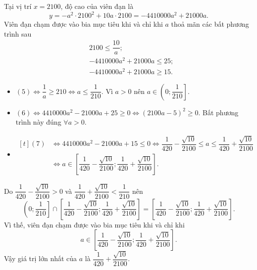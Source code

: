 \begin{vd}
{\begin{tikzpicture}[scale=1, font=\footnotesize, line join=round, line cap=round, >=stealth]
	\end{tikzpicture}}
	\loigiai
	{
		Tại vị trí $x=2100$, độ cao của viên đạn là
		\[y=-a^2\cdot 2100^2+10a\cdot 2100=-4410000a^2+21000a.\]
		Viên đạn chạm được vào bia mục tiêu khi và chỉ khi $a$ thoả mãn các bất phương trình sau
		\allowdisplaybreaks
		\begin{align*}
			&2100\leq\dfrac{10}{a} \tag{5}; \\
			&-4410000a^2+21000a\leq 25  \tag{6};\\
			&-4410000a^2+21000a\geq 15  \tag{7}.
		\end{align*}
		\begin{itemize}
			\item $(5)\Leftrightarrow\dfrac{1}{a}\geq 210\Leftrightarrow a\leq\dfrac{1}{210}$. Vì $a>0$ nên $a\in\left(0;\dfrac{1}{210}\right]$.
			\item $(6) \Leftrightarrow 4410000a^2-21000a+25\geq 0 \Leftrightarrow(2100a-5)^2\geq 0$. Bất phương trình này đúng $\forall a>0$.
			\item \allowdisplaybreaks
			$\begin{aligned}[t]
				(7)&\Leftrightarrow 4410000a^2-21000a+15\leq 0\Leftrightarrow\dfrac{1}{420}-\dfrac{\sqrt{10}}{2100}\leq a\leq\dfrac{1}{420}+\dfrac{\sqrt{10}}{2100}\\
				&\Leftrightarrow a\in\left[\dfrac{1}{420}-\dfrac{\sqrt{10}}{2100};\dfrac{1}{420}+\dfrac{\sqrt{10}}{2100}\right].
			\end{aligned}$
		\end{itemize}
		Do $\dfrac{1}{420}-\dfrac{\sqrt{10}}{2100}>0$ và $\dfrac{1}{420}+\dfrac{\sqrt{10}}{2100}<\dfrac{1}{210}$ nên
		\[\left(0;\dfrac{1}{210}\right]\cap\left[\dfrac{1}{420}-\dfrac{\sqrt{10}}{2100};\dfrac{1}{420}+\dfrac{\sqrt{10}}{2100}\right]=\left[\dfrac{1}{420}-\dfrac{\sqrt{10}}{2100};\dfrac{1}{420}+\dfrac{\sqrt{10}}{2100}\right].\]
		Vì thế, viên đạn chạm được vào bia mục tiêu khi và chỉ khi
		\[a\in\left[\dfrac{1}{420}-\dfrac{\sqrt{10}}{2100};\dfrac{1}{420}+\dfrac{\sqrt{10}}{2100}\right].\]
		Vậy giá trị lớn nhất của $a$ là $\dfrac{1}{420}+\dfrac{\sqrt{10}}{2100}$.
	}
\end{vd}

